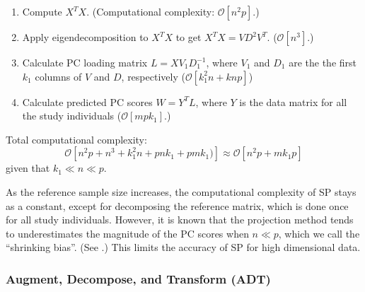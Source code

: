 \documentclass{article}
\newcommand{\bO}{\mathcal{O}}
\begin{document}
\begin{enumerate}
\item Compute $X^T X$.
  (Computational complexity: $\bO[n^2p]$.)  
\item Apply eigendecomposition to $X^T X$ to get $X^T X = V D^2 V^T$.
  ($\bO[n^3]$.)
\item Calculate PC loading matrix $L = X V_1 D_1^{-1}$,
where $V_1$ and $D_1$ are the the first $k_1$ columns of $V$ and $D$, respectively ($\bO[k_1^2 n + knp]$)
\item Calculate predicted PC scores $W = Y^T L$, where $Y$ is the data matrix for all the study individuals ($\bO[mpk_1]$.)
\end{enumerate}

Total computational complexity: 
\[
    \bO[n^2p + n^3 + k_1^2 n + pnk_1 + pmk_1)] \approx \bO[n^2p + mk_1p]
\]
given that $k_1 \ll n \ll p$.

As the reference sample size increases,
the computational complexity of SP stays as a constant,
except for decomposing the reference matrix, which is done once for all study individuals.
However, it is known that the projection method tends to underestimates the magnitude of the PC scores when $n \ll p$,
which we call the ``shrinking bias''. (See \cite{dey}.)
This limits the accuracy of SP for high dimensional data.

\subsubsection{Augment, Decompose, and Transform (ADT)}
\end{document}
